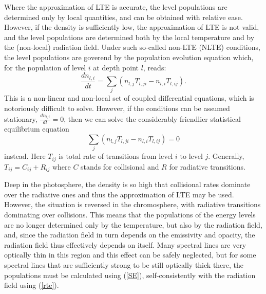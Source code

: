 \documentclass[referee]{aa}
\begin{document}
Where the approximation of LTE is accurate, the level populations are determined only by local quantities, and can be obtained with relative ease. However, if the density is sufficiently low, the approximation of LTE is not valid, and the level populations are determined both by the local temperature and by the (non-local) radiation field. Under such so-called non-LTE (NLTE) conditions, the level populations are goverend by the population evolution equation which, for the population of level $i$ at depth point $l$, reads:
\begin{equation}
 \frac{d n_{l,i}}{d t} = \sum_j (n_{l,j} T_{l,ji} - n_{l,i} T_{l,ij}).
\end{equation}
This is a non-linear and non-local set of coupled differential equations, which is notoriously difficult to solve. However, if the conditions can be assumed stationary, $\frac{d n_{l,i}}{d t} = 0$, then we can solve the considerably friendlier statistical equilibrium equation
\begin{equation}
 \sum_j (n_{l,j} T_{l,ji} - n_{l,i} T_{l,ij}) = 0
 \label{SE}
\end{equation}
instead. Here $T_{ij}$ is total rate of transitions from level $i$ to level $j$. Generally, $T_{ij} = C_{ij} + R_{ij}$ where $C$ stands for collisional and $R$ for radiative transitions.

Deep in the photosphere, the density is so high that collisional rates dominate over the radiative ones and thus the approximation of LTE may be used. However, the situation is reversed in the chromosphere, with radiative transitions dominating over collisions. This means that the populations of the energy levels are no longer determined only by the temperature, but also by the radiation field, and, since the radiation field in turn depends on the emissivity and opacity, the radiation field thus effectively depends on itself. Many spectral lines are very optically thin in this region and this effect can be safely neglected, but for some spectral lines that are sufficiently strong to be still optically thick there, the populations must be calculated using (\ref{SE}), self-consistently with the radiation field using (\ref{rte}). 
\end{document}
